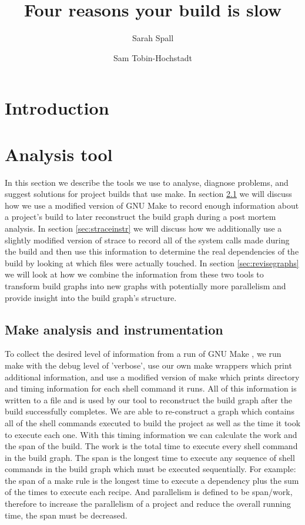 \documentclass[twocolumn,sigplan,10pt,review]{acmart}
\title{Four reasons your build is slow}
\author{Sarah Spall}
\affiliation{Indiana University}
\author{Sam Tobin-Hochstadt}
\affiliation{Indiana University}
\begin{document}
\maketitle

\section{Introduction}

\section{Analysis tool}
\label{sec:analysis}
In this section we describe the tools we use to analyse, diagnose problems, and suggest solutions
for project builds that use make.  In section \ref{sec:makeanalysis} we will discuss how we use
a modified version of GNU Make to record enough information about a project's build to later
reconstruct the build graph during a post mortem analysis.  In section \ref{sec:straceinstr} we
will discuss how we additionally use a slightly modified version of strace to record all of the
system calls made during the build and then use this information to determine the real dependencies
of the build by looking at which files were actually touched. In section \ref{sec:revisegraphs} we
will look at how we combine the information from these two tools to transform build graphs into
new graphs with potentially more parallelism and provide insight into the build graph's structure.

\subsection{Make analysis and instrumentation}
\label{sec:makeanalysis}

To collect the desired level of information from a run of GNU Make \cite{}, we run make with the
debug level of 'verbose', use our own make wrappers which print additional information, and use
a modified version of make which prints directory and timing information for each shell command
it runs.  All of this information is written to a file and is used by our tool to reconstruct
the build graph after the build successfully completes.  We are able to re-construct a graph which
contains all of the shell commands executed to build the project as well as the time it took
to execute each one.  With this timing information we can calculate the work and the span of the
build.  The work is the total time to execute every shell command in the build graph.  The span is
the longest time to execute any sequence of shell commands in the build graph which must be
executed sequentially.  For example: the span of a make rule is the longest time to execute a
dependency plus the sum of the times to execute each recipe.  And parallelism is defined to be
span/work, therefore to increase the parallelism of a project and reduce the overall running time,
the span must be decreased.
\end{document}
